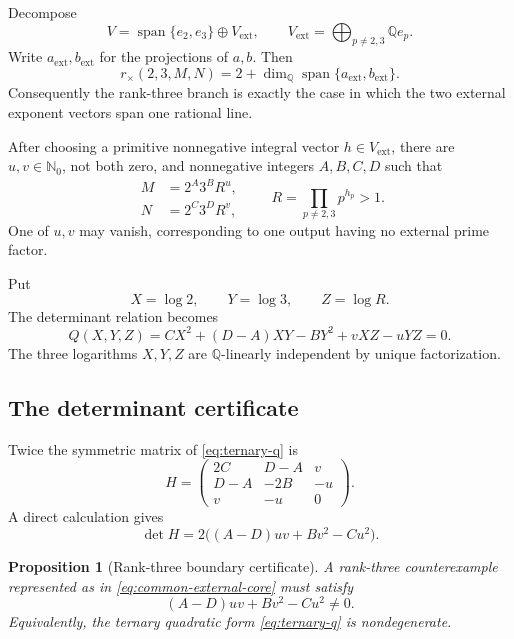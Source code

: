 \documentclass[11pt]{article}
\newtheorem{proposition}[theorem]{Proposition}
\theoremstyle{definition}
\theoremstyle{remark}
\newcommand{\Q}{\mathbb{Q}}
\newcommand{\Nzero}{\mathbb{N}_{0}}
\newcommand{\Span}{\operatorname{span}}
\begin{document}
Decompose
\[
 V=\Span\{e_2,e_3\}\oplus V_{\mathrm{ext}},
 \qquad
 V_{\mathrm{ext}}=\bigoplus_{p\ne2,3}\Q e_p.
\]
Write $a_{\mathrm{ext}},b_{\mathrm{ext}}$ for the projections of $a,b$.  Then
\begin{equation}
 r_{\times}(2,3,M,N)
 =2+\dim_{\Q}\Span\{a_{\mathrm{ext}},b_{\mathrm{ext}}\}.
 \label{eq:external-rank}
\end{equation}
Consequently the rank-three branch is exactly the case in which the two external exponent
vectors span one rational line.

After choosing a primitive nonnegative integral vector $h\in V_{\mathrm{ext}}$, there are
$u,v\in\Nzero$, not both zero, and nonnegative integers
$A,B,C,D$ such that
\begin{equation}
 \begin{aligned}
 M&=2^A3^B R^u,\\
 N&=2^C3^D R^v,
 \end{aligned}
 \qquad
 R=\prod_{p\ne2,3}p^{h_p}>1.
 \label{eq:common-external-core}
\end{equation}
One of $u,v$ may vanish, corresponding to one output having no external prime factor.

Put
\[
 X=\log2,
 \qquad Y=\log3,
 \qquad Z=\log R.
\]
The determinant relation becomes
\begin{equation}
 Q(X,Y,Z)
 =CX^2+(D-A)XY-BY^2+vXZ-uYZ=0.
 \label{eq:ternary-q}
\end{equation}
The three logarithms $X,Y,Z$ are $\Q$-linearly independent by unique factorization.

\subsection{The determinant certificate}

Twice the symmetric matrix of \eqref{eq:ternary-q} is
\begin{equation}
 H=
 \begin{pmatrix}
 2C&D-A&v\\
 D-A&-2B&-u\\
 v&-u&0
 \end{pmatrix}.
 \label{eq:H-matrix}
\end{equation}
A direct calculation gives
\begin{equation}
 \det H
 =2\bigl((A-D)uv+Bv^2-Cu^2\bigr).
 \label{eq:H-determinant}
\end{equation}

\begin{proposition}[Rank-three boundary certificate]
\label{prop:boundary-certificate}
A rank-three counterexample represented as in \eqref{eq:common-external-core} must satisfy
\begin{equation}
 (A-D)uv+Bv^2-Cu^2\ne0.
 \label{eq:boundary-nonzero}
\end{equation}
Equivalently, the ternary quadratic form \eqref{eq:ternary-q} is nondegenerate.
\end{proposition}
\end{document}
